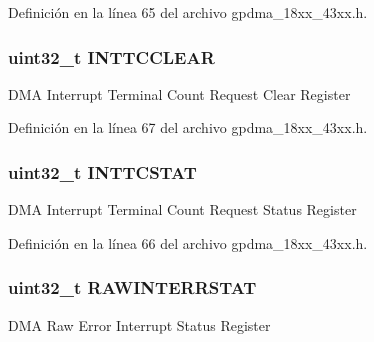 Definición en la línea 65 del archivo gpdma\+\_\+18xx\+\_\+43xx.\+h.

\subsubsection[{\texorpdfstring{I\+N\+T\+T\+C\+C\+L\+E\+AR}{INTTCCLEAR}}]{ uint32\+\_\+t I\+N\+T\+T\+C\+C\+L\+E\+AR}\hypertarget{struct_l_p_c___g_p_d_m_a___t_a3cdb3b46c6338446b38e098d533f3e90}{}\label{struct_l_p_c___g_p_d_m_a___t_a3cdb3b46c6338446b38e098d533f3e90}
D\+MA Interrupt Terminal Count Request Clear Register 

Definición en la línea 67 del archivo gpdma\+\_\+18xx\+\_\+43xx.\+h.

\subsubsection[{\texorpdfstring{I\+N\+T\+T\+C\+S\+T\+AT}{INTTCSTAT}}]{ uint32\+\_\+t I\+N\+T\+T\+C\+S\+T\+AT}\hypertarget{struct_l_p_c___g_p_d_m_a___t_a463cfd3eb2db7443d3af7538ed7d0043}{}\label{struct_l_p_c___g_p_d_m_a___t_a463cfd3eb2db7443d3af7538ed7d0043}
D\+MA Interrupt Terminal Count Request Status Register 

Definición en la línea 66 del archivo gpdma\+\_\+18xx\+\_\+43xx.\+h.

\subsubsection[{\texorpdfstring{R\+A\+W\+I\+N\+T\+E\+R\+R\+S\+T\+AT}{RAWINTERRSTAT}}]{ uint32\+\_\+t R\+A\+W\+I\+N\+T\+E\+R\+R\+S\+T\+AT}\hypertarget{struct_l_p_c___g_p_d_m_a___t_a22b61f0d5cc576a11cc44b34cfee7e60}{}\label{struct_l_p_c___g_p_d_m_a___t_a22b61f0d5cc576a11cc44b34cfee7e60}
D\+MA Raw Error Interrupt Status Register 

